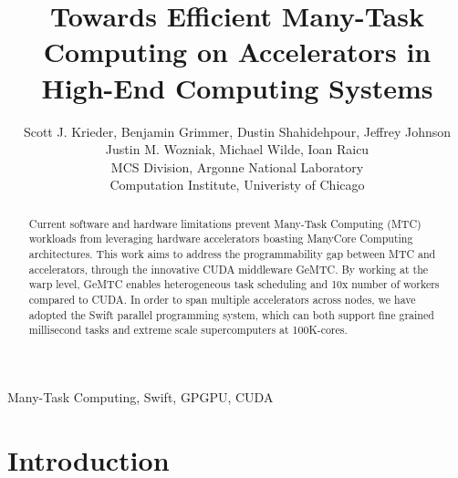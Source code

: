 \documentclass[conference]{IEEEtran}
\begin{document}
%
\title{Towards Efficient Many-Task Computing on Accelerators in High-End Computing Systems}


\author{Scott J. Krieder,
Benjamin Grimmer,
Dustin Shahidehpour,
Jeffrey Johnson\\
Justin M. Wozniak,
Michael Wilde,
Ioan Raicu\\
MCS Division, Argonne National Laboratory\\
Computation Institute, Univeristy of Chicago
}


\maketitle


\begin{abstract}
Current software and hardware limitations prevent Many-Task Computing (MTC) workloads from leveraging hardware accelerators boasting ManyCore Computing architectures. This work aims to address the programmability gap between MTC and accelerators, through the innovative CUDA middleware GeMTC. By working at the warp level, GeMTC enables heterogeneous task scheduling and 10x number of workers compared to CUDA. In order to span multiple accelerators across nodes, we have adopted the Swift parallel programming system, which can both support ﬁne grained millisecond tasks and extreme scale supercomputers at 100K-cores.
\end{abstract}

\begin{IEEEkeywords}
Many-Task Computing, Swift, GPGPU, CUDA
\end{IEEEkeywords}

\IEEEpeerreviewmaketitle

\section{Introduction}
\end{document}

